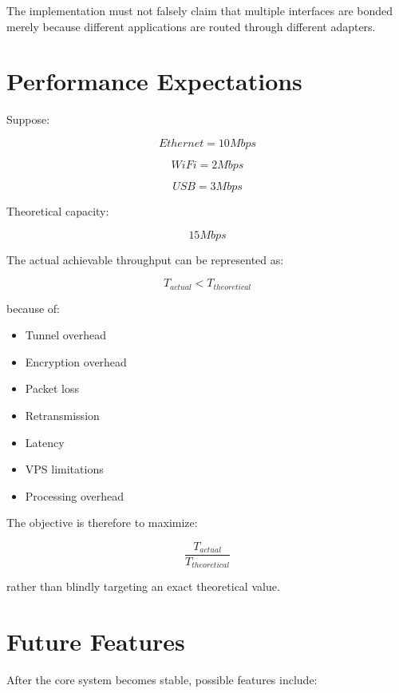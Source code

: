 \documentclass[12pt,a4paper]{article}
\begin{document}
The implementation must not falsely claim that multiple interfaces are bonded merely because different applications are routed through different adapters.


\section{Performance Expectations}

Suppose:

\[
Ethernet = 10 Mbps
\]

\[
WiFi = 2 Mbps
\]

\[
USB = 3 Mbps
\]

Theoretical capacity:

\[
15 Mbps
\]

The actual achievable throughput can be represented as:

\[
T_{actual} < T_{theoretical}
\]

because of:

\begin{itemize}
    \item Tunnel overhead
    \item Encryption overhead
    \item Packet loss
    \item Retransmission
    \item Latency
    \item VPS limitations
    \item Processing overhead
\end{itemize}

The objective is therefore to maximize:

\[
\frac{T_{actual}}{T_{theoretical}}
\]

rather than blindly targeting an exact theoretical value.


\section{Future Features}

After the core system becomes stable, possible features include:
\end{document}
